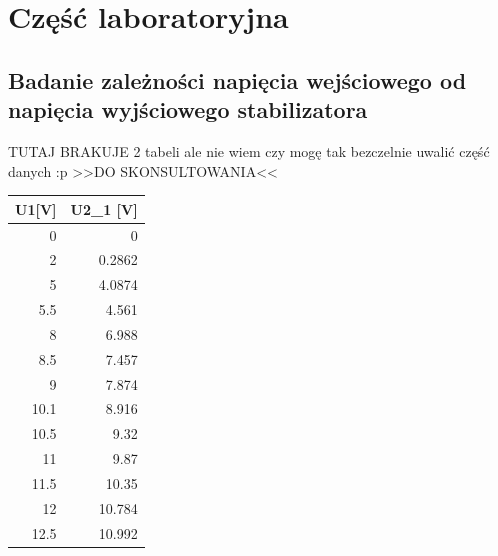 \documentclass[a4paper,12pt]{article}
\begin{document}
\section{Część laboratoryjna}
\subsection{Badanie zależności napięcia wejściowego od napięcia wyjściowego stabilizatora}
TUTAJ BRAKUJE 2 tabeli ale nie wiem czy mogę tak bezczelnie uwalić część danych :p >>DO SKONSULTOWANIA<<
\begin{table}[h]
\centering
\begin{tabular}{|r|r|}
\hline
\multicolumn{1}{|c|}{\textbf{U1{[}V{]}}} & \multicolumn{1}{c|}{\textbf{U2\_1 {[}V{]}}} \\ \hline
0                                        & 0                                           \\ \hline
2                                        & 0.2862                                      \\ \hline
5                                        & 4.0874                                      \\ \hline
5.5                                      & 4.561                                       \\ \hline
8                                        & 6.988                                       \\ \hline
8.5                                      & 7.457                                       \\ \hline
9                                        & 7.874                                       \\ \hline
10.1                                     & 8.916                                       \\ \hline
10.5                                     & 9.32                                        \\ \hline
11                                       & 9.87                                        \\ \hline
11.5                                     & 10.35                                       \\ \hline
12                                       & 10.784                                      \\ \hline
12.5                                     & 10.992                                      \\ \hline

\end{tabular}
\end{table}
\end{document}
